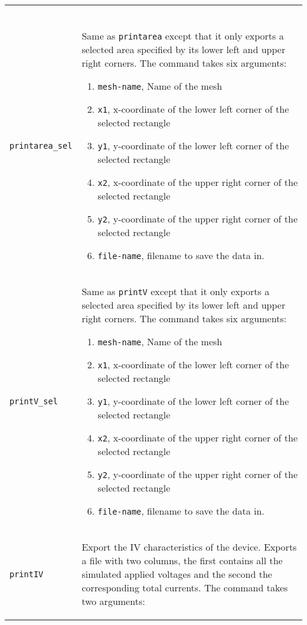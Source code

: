 \documentclass[noshowpacs,preprintnumbers,amsmath,amssymb, letter]{revtex4}
\begin{document}
\begin{longtable}{p{}p{}}
\begin{enumerate}
\end{enumerate}\\
\texttt{printarea\_sel}	& Same as \texttt{printarea} except that it only exports a selected area specified by its lower left and upper right corners. The command takes six arguments:
\begin{enumerate}
\item \texttt{mesh-name}, Name of the mesh
\item \texttt{x1}, x-coordinate of the lower left corner of the selected rectangle
\item \texttt{y1}, y-coordinate of the lower left corner of the selected rectangle
\item \texttt{x2}, x-coordinate of the upper right corner of the selected rectangle
\item \texttt{y2}, y-coordinate of the upper right corner of the selected rectangle
\item \texttt{file-name}, filename to save the data in.
\end{enumerate}\\
\texttt{printV\_sel}		& Same as \texttt{printV} except that it only exports a selected area specified by its lower left and upper right corners. The command takes six arguments:
\begin{enumerate}
\item \texttt{mesh-name}, Name of the mesh
\item \texttt{x1}, x-coordinate of the lower left corner of the selected rectangle
\item \texttt{y1}, y-coordinate of the lower left corner of the selected rectangle
\item \texttt{x2}, x-coordinate of the upper right corner of the selected rectangle
\item \texttt{y2}, y-coordinate of the upper right corner of the selected rectangle
\item \texttt{file-name}, filename to save the data in.
\end{enumerate}\\
\texttt{printIV}		& Export the IV characteristics of the device. Exports a file with two columns, the first contains all the simulated applied voltages and the second the corresponding total currents. The command takes two arguments:
\begin{enumerate}

\end{enumerate}
\end{longtable}
\end{document}
